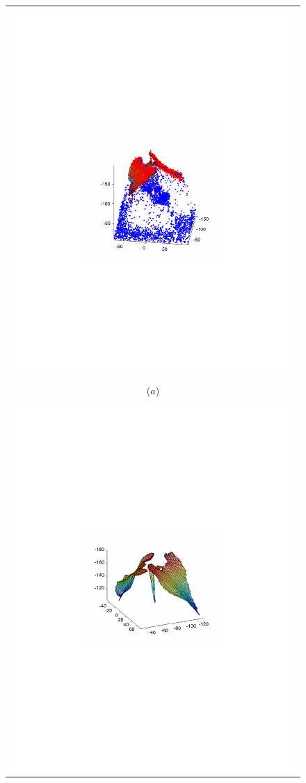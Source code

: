 \begin{figure}
\begin{center}
\begin{tabular}{c}
\includegraphics[trim=190 270 190 290,clip,width=0.7\linewidth]{Figures/bean3DMeshPlusPoints} \\
($a$) \\
\includegraphics[trim=190 280 190 290,clip,width=0.7\linewidth]{Figures/bean3DMesh} \\

\end{tabular}
\end{center}
\end{figure}
